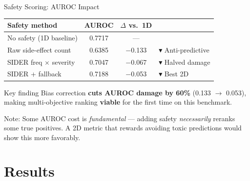 \documentclass[aspectratio=169,11pt]{beamer}
\begin{document}

\begin{frame}{Safety Scoring: AUROC Impact}

\begin{center}
\begin{table}
\centering
\large
\begin{tabular}{lccl}
\toprule
\textbf{Safety method} & \textbf{AUROC} & $\Delta$ \textbf{vs.\ 1D} & \\
\midrule
No safety (1D baseline) & 0.7717 & --- & \\
Raw side-effect count & 0.6385 & \textcolor{pillred}{$-$0.133} & \textcolor{pillred}{$\blacktriangledown$ Anti-predictive} \\
SIDER freq $\times$ severity & 0.7047 & \textcolor{pillorange}{$-$0.067} & \textcolor{pillorange}{$\blacktriangledown$ Halved damage} \\
SIDER + fallback & 0.7188 & \textcolor{pillgreen!80!black}{$-$0.053} & \textcolor{pillgreen!80!black}{$\blacktriangledown$ Best 2D} \\
\bottomrule
\end{tabular}
\end{table}
\end{center}

\vspace{1em}

\begin{block}{Key finding}
\centering
Bias correction \textbf{cuts AUROC damage by 60\%} (0.133 $\to$ 0.053),\\[4pt]
making multi-objective ranking \textbf{viable} for the first time on this benchmark.
\end{block}

\vspace{0.5em}

{\small Note: Some AUROC cost is \emph{fundamental} --- adding safety \emph{necessarily}
reranks some true positives. A 2D metric that rewards avoiding toxic predictions
would show this more favorably.}

\end{frame}

\section{Results}
\end{document}
